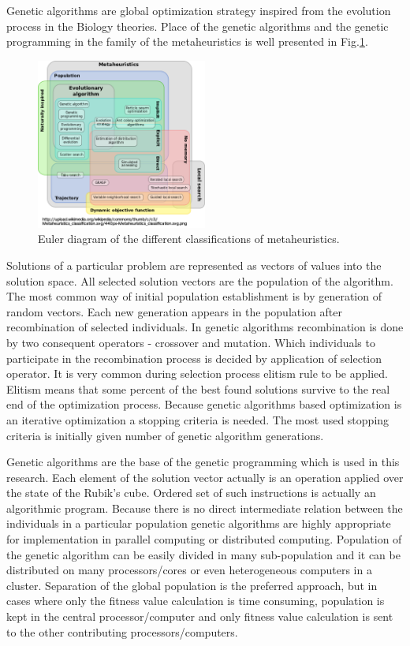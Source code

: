 \documentclass[runningheads]{llncs}
\begin{document}
Genetic algorithms are global optimization strategy inspired from the evolution process in the Biology theories. Place of the genetic algorithms and the genetic programming in the family of the metaheuristics is well presented in Fig.\ref{fig02}.

\begin{figure}
\includegraphics[width=0.5\textwidth]{fig02.png}
\centering
\caption{Euler diagram of the different classifications of metaheuristics.} \label{fig02}
\end{figure}
\FloatBarrier

Solutions of a particular problem are represented as vectors of values into the solution space. All selected solution vectors are the population of the algorithm. The most common way of initial population establishment is by generation of random vectors. Each new generation appears in the population after recombination of selected individuals. In genetic algorithms recombination is done by two consequent operators - crossover and mutation. Which individuals to participate in the recombination process is decided by application of selection operator. It is very common during selection process elitism rule to be applied. Elitism means that some percent of the best found solutions survive to the real end of the optimization process. Because genetic algorithms based optimization is an iterative optimization a stopping criteria is needed. The most used stopping criteria is initially given number of genetic algorithm generations. 

Genetic algorithms are the base of the genetic programming which is used in this research. Each element of the solution vector actually is an operation applied over the state of the Rubik's cube. Ordered set of such instructions is actually an algorithmic program. Because there is no direct intermediate relation between the individuals in a particular population genetic algorithms are highly appropriate for implementation in parallel computing or distributed computing. Population of the genetic algorithm can be easily divided in many sub-population and it can be distributed on many processors/cores or even heterogeneous computers in a cluster. Separation of the global population is the preferred approach, but in cases where only the fitness value calculation is time consuming, population is kept in the central processor/computer and only fitness value calculation is sent to the other contributing processors/computers. 
\end{document}
